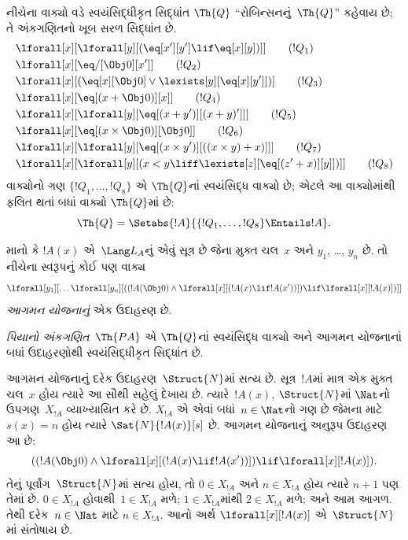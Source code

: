 \begin{defn}
નીચેના વાક્યો વડે સ્વયંસિદ્ધીકૃત સિદ્ધાંત
$\Th{Q}$ ``રોબિન્સનનું~$\Th{Q}$'' કહેવાય છે;
તે અંકગણિતનો ખૂબ સરળ સિદ્ધાંત છે.
\begin{align*}
& \lforall[x][\lforall[y][(\eq[x'][y'] \lif \eq[x][y])]] \tag{$!Q_1$}\\
& \lforall[x][\eq/[\Obj 0][x']] \tag{$!Q_2$}\\
& \lforall[x][(\eq[x][\Obj 0] \lor \lexists[y][\eq[x][y']])] \tag{$!Q_3$}\\
& \lforall[x][\eq[(x + \Obj 0)][x]] \tag{$!Q_4$}\\
& \lforall[x][\lforall[y][\eq[(x + y')][(x + y)']]] \tag{$!Q_5$}\\
& \lforall[x][\eq[(x \times \Obj 0)][\Obj 0]] \tag{$!Q_6$}\\
& \lforall[x][\lforall[y][\eq[(x \times y')][((x \times y) + x)]]] \tag{$!Q_7$}\\
& \lforall[x][\lforall[y][(x < y \liff \lexists[z][\eq[(z' + x)][y]])]] \tag{$!Q_8$}
\end{align*}
વાક્યોનો ગણ $\{!Q_1, \dots, !Q_8\}$ એ
$\Th{Q}$નાં સ્વયંસિદ્ધ વાક્યો છે; એટલે આ
વાક્યોમાંથી ફલિત થતાં બધાં વાક્યો
$\Th{Q}$માં છે:
\[
\Th{Q} = \Setabs{!A}{\{!Q_1, \dots, !Q_8\} \Entails !A}.
\]
\end{defn}

\begin{defn}
માનો કે $!A(x)$ એ~$\Lang L_A$નું એવું
સૂત્ર છે જેના મુક્ત ચલ~$x$ અને
$y_1$, \dots, $y_n$ છે. તો નીચેના સ્વરૂપનું
કોઈ પણ વાક્ય
\[
\lforall[y_1][\dots\lforall[y_n][((!A(\Obj 0) \land \lforall[x][(!A(x)
\lif !A(x'))]) \lif \lforall[x][!A(x)])]]
\]
\emph{આગમન યોજનાનું} એક ઉદાહરણ છે.

\emph{પિયાનો અંકગણિત}~$\Th{PA}$ એ
$\Th{Q}$નાં સ્વયંસિદ્ધ વાક્યો અને આગમન
યોજનાનાં બધાં ઉદાહરણોથી સ્વયંસિદ્ધીકૃત
સિદ્ધાંત છે.
\end{defn}

\begin{explain}
આગમન યોજનાનું દરેક ઉદાહરણ~$\Struct{N}$માં
સત્ય છે. સૂત્ર~$!A$માં માત્ર એક મુક્ત
ચલ~$x$ હોય ત્યારે આ સૌથી સહેલું
દેખાય છે. ત્યારે~$!A(x)$, $\Struct{N}$માં
$\Nat$નો ઉપગણ~$X_{!A}$ વ્યાખ્યાયિત કરે છે.
$X_{!A}$ એ એવાં બધાં~$n \in \Nat$નો ગણ છે
જેમના માટે $s(x)=n$ હોય ત્યારે
$\Sat{N}{!A(x)}[s]$ છે. આગમન યોજનાનું
અનુરૂપ ઉદાહરણ આ છે:
\[
((!A(\Obj 0) \land \lforall[x][(!A(x) \lif !A(x'))]) \lif 
  \lforall[x][!A(x)]).
\]
તેનું પૂર્વાંગ~$\Struct{N}$માં સત્ય હોય,
તો $0 \in X_{!A}$ અને $n \in X_{!A}$ હોય
ત્યારે $n+1$ પણ તેમાં છે. $0 \in X_{!A}$
હોવાથી~$1 \in X_{!A}$ મળે; $1 \in X_{!A}$માંથી
$2 \in X_{!A}$ મળે; અને આમ આગળ.
તેથી દરેક~$n \in \Nat$ માટે
$n \in X_{!A}$. આનો અર્થ
$\lforall[x][!A(x)]$ એ~$\Struct{N}$માં
સંતોષાય છે.
\end{explain}

